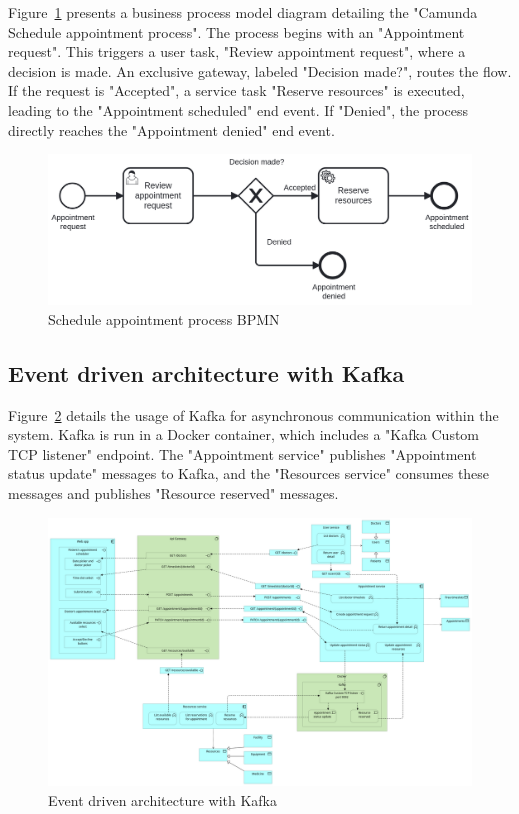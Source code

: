 \documentclass[11pt,english,a4paper,twoside]{article}
\begin{document}
Figure~\ref{fig:bpmn-appt} presents a business process model diagram
detailing the "Camunda Schedule appointment process".
The process begins with an "Appointment request". This triggers a user task,
"Review appointment request", where a decision is made. An exclusive gateway,
labeled "Decision made?", routes the flow. If the request is "Accepted", a
service task "Reserve resources" is executed, leading to the "Appointment
scheduled" end event. If "Denied", the process directly reaches the
"Appointment denied" end event.

\begin{figure}[H]
    \centering
    \includegraphics[width=\textwidth]{./fig/bpmn-appt-scheduling.png}
    \caption{Schedule appointment process BPMN}
    \label{fig:bpmn-appt}
\end{figure}

\subsection{Event driven architecture with Kafka}

Figure~\ref{fig:kafka} details the usage of Kafka for asynchronous
communication within the system. Kafka is run in a Docker container,
which includes a "Kafka Custom TCP listener" endpoint. The "Appointment service"
publishes "Appointment status update" messages to Kafka, and the "Resources
service" consumes these messages and publishes "Resource reserved"
messages.

\begin{figure}[H]
    \centering
    \includegraphics[width=\textwidth]{./fig/8. Application Kafka.png}
    \caption{Event driven architecture with Kafka}
    \label{fig:kafka}
\end{figure}
\end{document}
